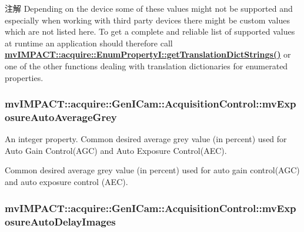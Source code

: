 \begin{DoxyNote}{注解}
Depending on the device some of these values might not be supported and especially when working with third party devices there might be custom values which are not listed here. To get a complete and reliable list of supported values at runtime an application should therefore call {\bfseries \hyperlink{classmv_i_m_p_a_c_t_1_1acquire_1_1_enum_property_i_a0ba6ccbf5ee69784d5d0b537924d26b6}{mv\+I\+M\+P\+A\+C\+T\+::acquire\+::\+Enum\+Property\+I\+::get\+Translation\+Dict\+Strings()}} or one of the other functions dealing with translation dictionaries for enumerated properties. 
\end{DoxyNote}
\hypertarget{classmv_i_m_p_a_c_t_1_1acquire_1_1_gen_i_cam_1_1_acquisition_control_abfe22d85a47e70a4735bf7c496757f6c}{
\subsubsection[{mv\+Exposure\+Auto\+Average\+Grey}]{ mv\+I\+M\+P\+A\+C\+T\+::acquire\+::\+Gen\+I\+Cam\+::\+Acquisition\+Control\+::mv\+Exposure\+Auto\+Average\+Grey}}\label{classmv_i_m_p_a_c_t_1_1acquire_1_1_gen_i_cam_1_1_acquisition_control_abfe22d85a47e70a4735bf7c496757f6c}


An integer property. Common desired average grey value (in percent) used for Auto Gain Control(\+A\+G\+C) and Auto Exposure Control(\+A\+E\+C). 

Common desired average grey value (in percent) used for auto gain control(\+A\+G\+C) and auto exposure control (A\+E\+C). \hypertarget{classmv_i_m_p_a_c_t_1_1acquire_1_1_gen_i_cam_1_1_acquisition_control_a5e1471f52a0be9d3d97ef955846577b2}{
\subsubsection[{mv\+Exposure\+Auto\+Delay\+Images}]{ mv\+I\+M\+P\+A\+C\+T\+::acquire\+::\+Gen\+I\+Cam\+::\+Acquisition\+Control\+::mv\+Exposure\+Auto\+Delay\+Images}}\label{classmv_i_m_p_a_c_t_1_1acquire_1_1_gen_i_cam_1_1_acquisition_control_a5e1471f52a0be9d3d97ef955846577b2}


